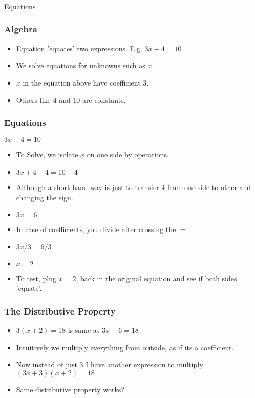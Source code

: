 \begin{frame}[fragile]\frametitle{}
\begin{center}
{\Large Equations}
\end{center}
\end{frame}

 \begin{frame}[fragile]\frametitle{Algebra}
\begin{itemize}
\item Equation 'equates' two expressions. E.g. $3x+4=10$
\item We solve equations for unknowns such as $x$
\item $x$ in the equation above have coefficient $3$.
\item Others like $4$ and $10$ are constants.
\end{itemize}
\end{frame}

 \begin{frame}[fragile]\frametitle{Equations}
 $3x+4=10$
\begin{itemize}
\item To Solve, we isolate $x$ on one side by operations.
\item $3x + 4 - 4 = 10 - 4$
\item Although a short hand way is just to transfer $4$ from one side to other and changing the sign.
\item $3x = 6$
\item In case of coefficients, you divide after crossing the $=$
\item $3x/3 = 6/3$
\item $x = 2$
\item To test, plug $x=2$, back in the original equation and see if both sides 'equate'.
\end{itemize}
\end{frame}

 \begin{frame}[fragile]\frametitle{The Distributive Property}
 
\begin{itemize}
\item $3(x+2)=18$ is same as $3x + 6 = 18$
\item Intuitively we multiply everything from outside, as if its a coefficient.
\item Now instead of just 3 I have another expression to multiply $(3x + 3)(x+2) = 18$
\item Same distributive property works?
\end{itemize}
\end{frame}

